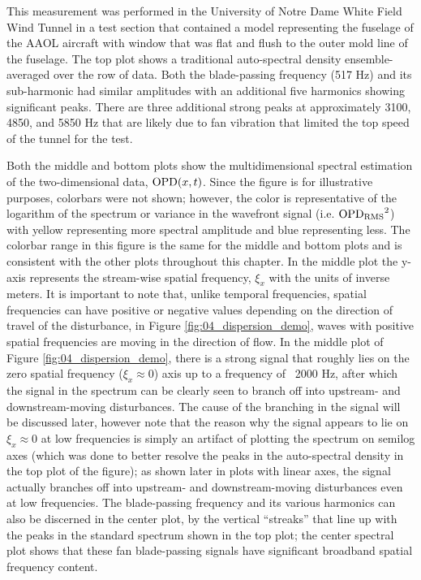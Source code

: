 This measurement was performed in the University of Notre Dame White Field Wind Tunnel in a test section that contained a model representing the fuselage of the AAOL aircraft \cite{Jumper-2013-8KtN3pue} with window that was flat and flush to the outer mold line of the fuselage.
The top plot shows a traditional auto-spectral density ensemble-averaged over the row of data.
Both the blade-passing frequency (517 Hz) and its sub-harmonic had similar amplitudes  with an additional five harmonics showing significant peaks.
There are three additional strong peaks at approximately 3100, 4850, and 5850 Hz that are likely due to fan vibration that limited the top speed of the tunnel for the test.

Both the middle and bottom plots show the multidimensional spectral estimation of the two-dimensional data, $\operatorname{OPD}(x,t)$.
Since the figure is for illustrative purposes, colorbars were not shown; however, the color is representative of the logarithm of the spectrum or variance in the wavefront signal (i.e. $\operatorname{OPD_{RMS}}^2$) with yellow representing more spectral amplitude and blue representing less.
The colorbar range in this figure is the same for the middle and bottom plots and is consistent with the other plots throughout this chapter.
In the middle plot the y-axis represents the stream-wise spatial frequency, $\xi_x$ with the units of inverse meters.
It is important to note that, unlike temporal frequencies, spatial frequencies can have positive or negative values depending on the direction of travel of the disturbance,
in Figure \ref{fig:04_dispersion_demo}, waves with positive spatial frequencies are moving in the direction of flow.
In the middle plot of Figure \ref{fig:04_dispersion_demo}, there is a strong signal that roughly lies on the zero spatial frequency ($\xi_x\approx0$) axis up to a frequency of ~2000 Hz, after which the signal in the spectrum can be clearly seen to branch off into upstream- and downstream-moving disturbances.
The cause of the branching in the signal will be discussed later, however note that the reason why the signal appears to lie on $\xi_x\approx0$ at low frequencies is simply an artifact of plotting the spectrum on semilog axes (which was done to better resolve the peaks in the auto-spectral density in the top plot of the figure); as shown later in plots with linear axes, the signal actually branches off into upstream- and downstream-moving disturbances even at low frequencies.
The blade-passing frequency and its various harmonics can also be discerned in the center plot, by the vertical ``streaks'' that line up  with the peaks in the standard spectrum shown in the top plot; the center spectral plot shows that these fan blade-passing signals have significant broadband spatial frequency content.
